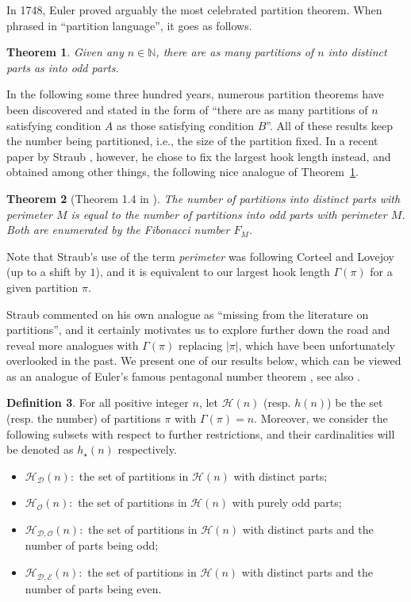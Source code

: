 \documentclass[12pt]{amsart}
\numberwithin{equation}{section}
\theoremstyle{plain}
\newtheorem{theorem}{Theorem}[section]
\theoremstyle{definition}
\newtheorem{Def}[theorem]{Definition}
\newcommand{\N}{\mathbb{N}}
\def\D{\mathcal{D}}
\def\O{\mathcal{O}}
\def\H{\mathcal{H}}
\def\E{\mathcal{E}}
\begin{document}
In 1748, Euler \cite{Eu} proved arguably the most celebrated partition theorem. When phrased in ``partition language'', it goes as follows.
\begin{theorem}\label{od}
Given any $n\in\N$, there are as many partitions of $n$ into distinct parts as into odd parts.
\end{theorem}

In the following some three hundred years, numerous partition theorems have been discovered and stated in the form of ``there are as many partitions of $n$ satisfying condition $A$ as those satisfying condition $B$''. All of these results keep the number being partitioned, i.e., the size of the partition fixed. In a recent paper by Straub \cite{Str}, however, he chose to fix the largest hook length instead, and obtained among other things, the following nice analogue of Theorem~\ref{od}.
\begin{theorem}[Theorem 1.4 in \cite{Str}]
\label{ana-od}
The number of partitions into distinct parts with perimeter $M$ is equal to the number of partitions into odd parts with perimeter $M$. Both are enumerated by the Fibonacci number $F_M$.
\end{theorem}
Note that Straub's use of the term \emph{perimeter} was following Corteel and Lovejoy \cite[Section 4.2]{CL} (up to a shift by $1$), and it is equivalent to our largest hook length $\Gamma(\pi)$ for a given partition $\pi$.

Straub commented on his own analogue as ``missing from the literature on partitions'', and it certainly motivates us to explore further down the road and reveal more analogues with $\Gamma(\pi)$ replacing $|\pi|$, which have been unfortunately overlooked in the past. We present one of our results below, which can be viewed as an analogue of Euler's famous pentagonal number theorem \cite{Eu1}, see also \cite[Corollary~1.7]{Andr}.
\begin{Def}
For all positive integer $n$, let $\H(n)$ (resp. $h(n)$) be the set (resp. the number) of partitions $\pi$ with $\Gamma(\pi)=n$. Moreover, we consider the following subsets with respect to further restrictions, and their cardinalities will be denoted as $h_{\star}(n)$ respectively.
\begin{itemize}
\item $\H_{\D}(n):$ the set of partitions in $\H(n)$ with distinct parts;
\item $\H_{\O}(n):$ the set of partitions in $\H(n)$ with purely odd parts;
\item $\H_{\D,\O}(n):$ the set of partitions in $\H(n)$ with distinct parts and the number of parts being odd;
\item $\H_{\D,\E}(n):$ the set of partitions in $\H(n)$ with distinct parts and the number of parts being even.
\end{itemize}
\end{Def}
\end{document}
